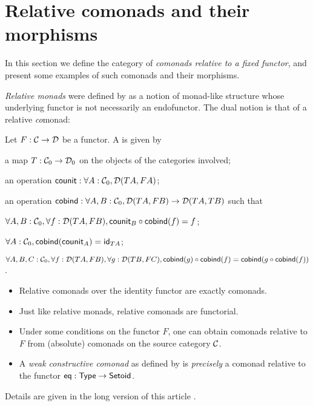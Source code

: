 \documentclass[envcountsame]{llncs}
\begin{document}
\section{Relative comonads and their morphisms}\label{sec:comonads}

In this section we define the category of \emph{comonads relative to a fixed functor}, and present some examples 
of such comonads and their morphisms.

\emph{Relative monads} were defined by \textcite{DBLP:conf/fossacs/AltenkirchCU10} as a notion of monad-like structure
whose underlying functor is not necessarily an endofunctor.
The dual notion is that of a relative \emph{co}monad:

\begin{definition}%
 \label{def:rel_comonad}
  Let $F:\C\to\D$ be a functor. A  is given by
  \begin{packitem}
   \item a map $T:\C_0 \to \D_0$ on the objects of the categories involved;
   \item an operation $\counit : \forall A : \C_0, \D(TA,FA)$;
   \item an operation $\cobind: \forall A,B:\C_0, \D(TA,FB) \to \D(TA,TB)$
   such that
   \item $\forall A,B:\C_0, \forall f:\D(TA,FB), \comp{\cobind(f)}{\counit_B} = f$;
   \item $\forall A : \C_0, \cobind(\counit_A) = \id_{TA}$;
   \item $\forall A,B,C:\C_0, \forall f : \D(TA,FB),\forall g:\D(TB,FC), \\
        \comp{\cobind(f)}{\cobind(g)} = \cobind(\comp{\cobind(f)}{g})$.
  \end{packitem} 
\end{definition}

\begin{Short}
\begin{remark}\label{def:lift}
 \begin{itemize}
  \item Relative comonads over the identity functor are exactly comonads.
  \item Just like relative monads, relative comonads are functorial.
  \item Under some conditions on the functor $F$, one can obtain comonads relative to $F$ from (absolute) comonads on the 
 source category $\C$.
  \item A \emph{weak constructive comonad} as defined by \textcite{DBLP:conf/types/MatthesP11}  is \emph{precisely}
  a comonad relative to the functor $\eq : \Set\to\Setoid$.
 \end{itemize}
\noindent
Details are given in the long version of this article \parencite{trimat_coq}.
\end{remark}
\end{Short}
\end{document}
